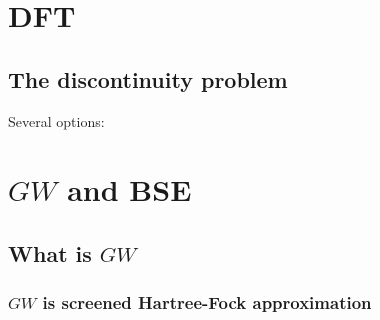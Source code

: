 \documentclass[hyperref, a4paper, 12pt]{report}
\begin{document}
\chapter{DFT}

\section{The discontinuity problem}

Several options: \cite{andrade2011prediction,zheng2011improving}

\chapter{$GW$ and BSE}

\section{What is $GW$}

\subsection{$GW$ is screened Hartree-Fock approximation}
\end{document}
